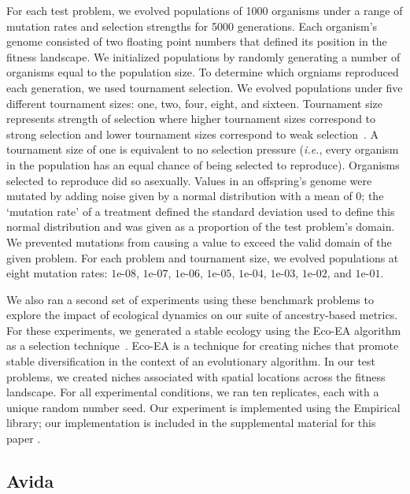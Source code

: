 \documentclass[letterpaper]{article}
\begin{document}
For each test problem, we evolved populations of 1000 organisms under a range of mutation rates and selection strengths for 5000 generations. Each organism's genome consisted of two floating point numbers that defined its position in the fitness landscape.
We initialized populations by randomly generating a number of organisms equal to the population size.
To determine which orgniams reproduced each generation, we used tournament selection. We evolved populations under five different tournament sizes: one, two, four, eight, and sixteen. Tournament size represents strength of selection where higher tournament sizes correspond to strong selection and lower tournament sizes correspond to weak selection~\citep{blickle1995mathematical}.
A tournament size of one is equivalent to no selection pressure (\textit{i.e.}, every organism in the population has an equal chance of being selected to reproduce). Organisms selected to reproduce did so asexually. Values in an offspring's genome were mutated by adding noise given by a normal distribution with a mean of 0; the `mutation rate' of a treatment defined the standard deviation used to define this normal distribution and was given as a proportion of the test problem's domain. 
We prevented mutations from causing a value to exceed the valid domain of the given problem. 
For each problem and tournament size, we evolved populations at eight mutation rates: $1\text{e-}08$, $1\text{e-}07$, $1\text{e-}06$, $1\text{e-}05$, $1\text{e-}04$, $1\text{e-}03$, $1\text{e-}02$, and $1\text{e-}01$. 

We also ran a second set of experiments using these benchmark problems to explore the impact of ecological dynamics on our suite of ancestry-based metrics. For these experiments, we generated a stable ecology using the Eco-EA algorithm as a selection technique~\citep{goings_ecology-based_2012}. Eco-EA is %
a technique for creating niches that promote stable diversification in the context of an evolutionary algorithm. In %
our test problems, we created niches associated with spatial locations across the fitness landscape. 
For all experimental conditions, we ran ten replicates, each with a unique random number seed. 
Our experiment is implemented using the Empirical library; our implementation is included in the supplemental material for this paper \citep{supplement}. 

\subsection{Avida}
\end{document}
